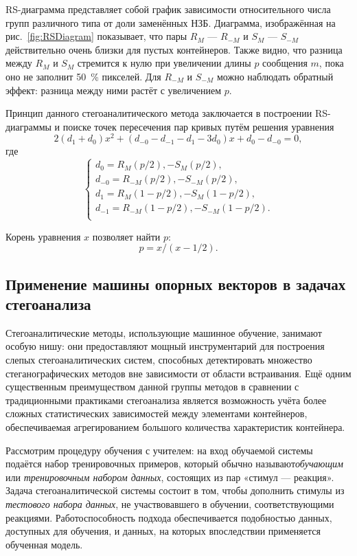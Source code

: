 RS-диаграмма представляет собой график зависимости относительного числа групп различного типа от доли заменённых НЗБ. Диаграмма, изображённая на рис.~\ref{fig:RSDiagram} показывает, что пары $ R_M $ --- $ R_{-M} $ и $ S_M $ --- $ S_{-M} $ действительно очень близки для пустых контейнеров. Также видно, что разница между $ R_M $  и $ S_M $ стремится к нулю при увеличении длины $ p $ сообщения $ m $, пока оно не заполнит 50~\% пикселей. Для $ R_{-M} $ и $ S_{-M} $ можно наблюдать обратный эффект: разница между ними растёт с увеличением $ p $.

Принцип данного стегоаналитического метода заключается в построении RS-диаграммы и поиске точек пересечения пар кривых путём решения уравнения
\begin{equation*}
2(d_1 + d_0)x^2 + (d_{-0} - d_{-1} - d_1 - 3{d_0})x + d_0 - d_{-0} = 0,
\end{equation*}
где
\begin{equation*}
\begin{cases}
d_0 = R_M(p/2), - S_M(p/2), \\
d_{-0} = R_{-M}(p/2), - S_{-M}(p/2), \\
d_1 = R_M(1 - p/2), - S_M(1 - p/2), \\
d_{-1} = R_{-M}(1 - p/2), - S_{-M}(1 - p/2). \\
\end{cases}
\end{equation*}

Корень уравнения $ x $ позволяет найти $ p $:
\begin{equation*}
p = x/(x - 1/2).
\end{equation*}

\subsection{Применение машины опорных векторов в задачах стегоанализа}

Стегоаналитические методы, использующие машинное обучение, занимают особую нишу: они предоставляют мощный инструментарий для построения слепых стегоаналитических систем, способных детектировать множество стеганографических методов вне зависимости от области встраивания. Ещё одним существенным преимуществом данной группы методов в сравнении с традиционными практиками стегоанализа является возможность учёта более сложных статистических зависимостей между элементами контейнеров, обеспечиваемая агрегированием большого количества характеристик контейнера.

Рассмотрим процедуру обучения с учителем: на вход обучаемой системы подаётся набор тренировочных примеров, который обычно называют\textit{обучающим} или \textit{тренировочным набором данных}, состоящих из пар «стимул --- реакция». Задача стегоаналитической системы состоит в том, чтобы дополнить стимулы из \textit{тестового набора данных}, не участвовавшего в обучении, соответствующими реакциями. Работоспособность подхода обеспечивается подобностью данных, доступных для обучения, и данных, на которых впоследствии применяется обученная модель.

